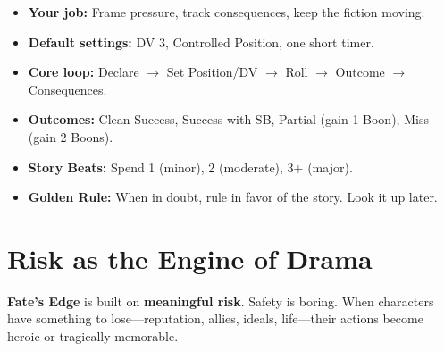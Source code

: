 \begin{center}
\end{center}

\begin{tcolorbox}[
  colback=blue!3!white,
  colframe=blue!60!black,
  title={Chapter Summary: Core Procedures in One Page},
  breakable
]
\small
\begin{itemize}
  \item \textbf{Your job:} Frame pressure, track consequences, keep the fiction moving.
  \item \textbf{Default settings:} DV 3, Controlled Position, one short timer.
  \item \textbf{Core loop:} Declare $\rightarrow$ Set Position/DV $\rightarrow$ Roll $\rightarrow$ Outcome $\rightarrow$ Consequences.
  \item \textbf{Outcomes:} Clean Success, Success with SB, Partial (gain 1 Boon), Miss (gain 2 Boons).
  \item \textbf{Story Beats:} Spend 1 (minor), 2 (moderate), 3+ (major).
  \item \textbf{Golden Rule:} When in doubt, rule in favor of the story. Look it up later.
\end{itemize}
\end{tcolorbox}

\section{Risk as the Engine of Drama}
\label{sec:gm-risk-drama}

\textbf{Fate's Edge} is built on \textbf{meaningful risk}. Safety is boring. When characters have something to lose---reputation, allies, ideals, life---their actions become heroic or tragically memorable.

